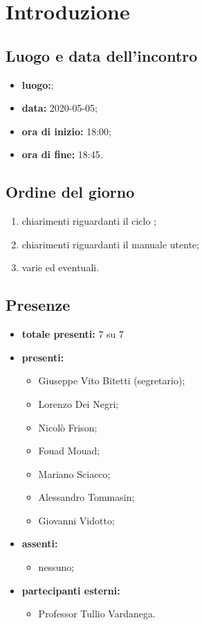 \section*{Introduzione}

\subsection*{Luogo e data dell'incontro}
	\begin{itemize}
		\item \textbf{luogo:};
		\item \textbf{data:} 2020-05-05;
		\item \textbf{ora di inizio:} 18:00;
		\item \textbf{ora di fine:} 18:45.
	\end{itemize}

\subsection*{Ordine del giorno}
	\begin{enumerate}
		\item chiarimenti riguardanti il ciclo ;
		\item chiarimenti riguardanti il manuale utente;
		\item varie ed eventuali.
	\end{enumerate}

\subsection*{Presenze}
	\begin{itemize}
		\item \textbf{totale presenti:} 7 su 7
		\item \textbf{presenti: }
			\begin{itemize}
				\item Giuseppe Vito Bitetti (segretario);
				\item Lorenzo Dei Negri;
				\item Nicolò Frison;
				\item Fouad Mouad;
				\item Mariano Sciacco;
				\item Alessandro Tommasin;
				\item Giovanni Vidotto;
			\end{itemize}
		\item \textbf{assenti: }
			\begin{itemize}
				\item nessuno;
			\end{itemize}
		\item \textbf{partecipanti esterni:}
			\begin{itemize}
				\item Professor Tullio Vardanega.
			\end{itemize}
	\end{itemize}

